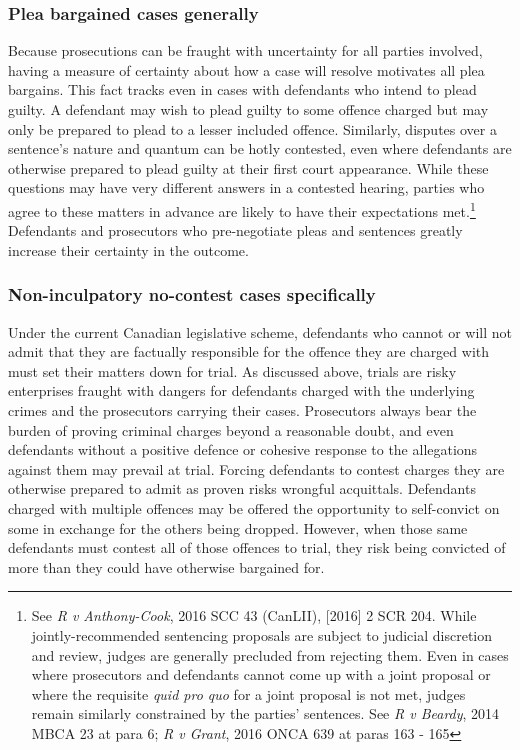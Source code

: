 \subsubsection{Plea bargained cases generally}

Because prosecutions can be fraught with uncertainty for all parties involved, having a measure of certainty about how a case will resolve motivates all plea bargains. This fact tracks even in cases with defendants who intend to plead guilty. A defendant may wish to plead guilty to some offence charged but may only be prepared to plead to a lesser included offence. Similarly, disputes over a sentence's nature and quantum can be hotly contested, even where defendants are otherwise prepared to plead guilty at their first court appearance. While these questions may have very different answers in a contested hearing, parties who agree to these matters in advance are likely to have their expectations met.\footnote{See \textit{R v Anthony-Cook}, 2016 SCC 43 (CanLII), [2016] 2 SCR 204. While jointly-recommended sentencing proposals are subject to judicial discretion and review, judges are generally precluded from rejecting them. Even in cases where prosecutors and defendants cannot come up with a joint proposal or where the requisite \textit{quid pro quo} for a joint proposal is not met, judges remain similarly constrained by the parties' sentences. See \textit{R v Beardy}, 2014 MBCA 23 at para 6; \textit{R v Grant}, 2016 ONCA 639 at paras 163 - 165} Defendants and prosecutors who pre-negotiate pleas and sentences greatly increase their certainty in the outcome.

\subsubsection{Non-inculpatory no-contest cases specifically}

Under the current Canadian legislative scheme, defendants who cannot or will not admit that they are factually responsible for the offence they are charged with must set their matters down for trial. As discussed above, trials are risky enterprises fraught with dangers for defendants charged with the underlying crimes and the prosecutors carrying their cases. Prosecutors always bear the burden of proving criminal charges beyond a reasonable doubt, and even defendants without a positive defence or cohesive response to the allegations against them may prevail at trial. Forcing defendants to contest charges they are otherwise prepared to admit as proven risks wrongful acquittals. Defendants charged with multiple offences may be offered the opportunity to self-convict on some in exchange for the others being dropped. However, when those same defendants must contest all of those offences to trial, they risk being convicted of more than they could have otherwise bargained for.

